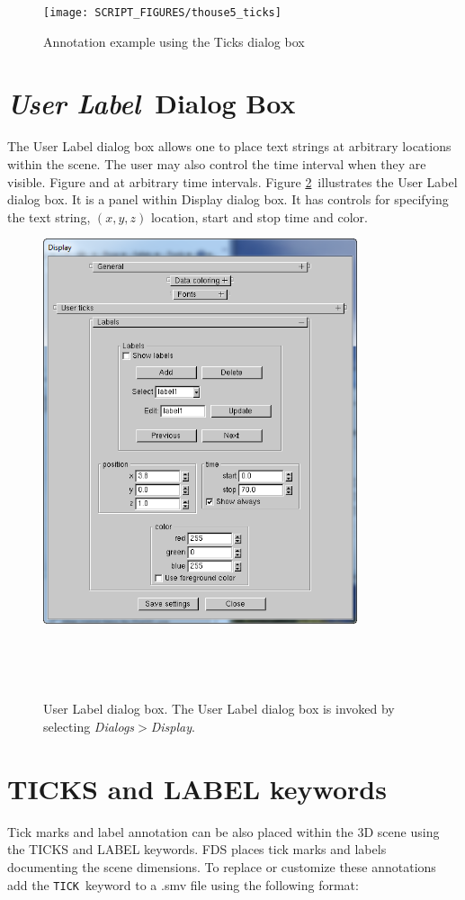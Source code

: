 \documentclass[11pt,twoside]{book}
\begin{document}
\begin{figure}[bph]
\begin{center}
\texttt{[image: SCRIPT\_FIGURES/thouse5\_ticks]}
\end{center}
\caption{Annotation example using the Ticks dialog box}
\label{figTICKSdialogexample}%
\end{figure}

\section{{\em User Label}\ Dialog Box}
The User Label dialog box allows one to place
text strings at arbitrary locations within the scene.  The user may also
control the time interval when they are visible.  Figure  and at arbitrary time intervals.
Figure \ref{figLABELdialog}\ illustrates the User Label
dialog box.  It is a panel within Display dialog box.
It has controls for specifying the text string, $(x,y,z)$ location,
start and stop time and color.

\begin{figure}[bph]
\centerline{
\includegraphics[width=3.631944in]{FIGURES/figLABEL}
}\ \caption[User Label dialog box.]{User Label dialog
box. The User Label dialog box is invoked by selecting {\em
Dialogs$>$Display}. }\ \label{figLABELdialog}
\end{figure}



\section{TICKS and LABEL keywords}
Tick marks and label annotation
can be also placed within the 3D scene using the TICKS and LABEL keywords.
FDS places tick marks and labels
documenting the scene dimensions.  To replace or customize
these annotations add the {\tt TICK}\ keyword to a .smv file
using the following format:
\end{document}
